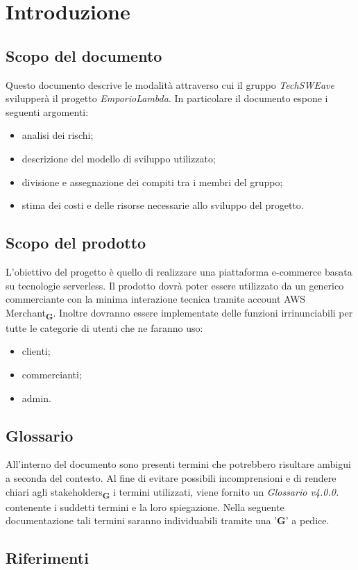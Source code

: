 \section{Introduzione}
\subsection{Scopo del documento}
Questo documento descrive le modalità attraverso cui il gruppo \emph{TechSWEave} svilupperà il progetto \emph{EmporioLambda}. In particolare il documento espone i seguenti argomenti:
\begin{itemize}
    \item analisi dei rischi;
    \item descrizione del modello di sviluppo utilizzato;
    \item divisione e assegnazione dei compiti tra i membri del gruppo;
    \item stima dei costi e delle risorse necessarie allo sviluppo del progetto.
\end{itemize}
\subsection{Scopo del prodotto}
L'obiettivo del progetto è quello di realizzare una piattaforma e-commerce basata su tecnologie serverless. Il prodotto dovrà poter essere utilizzato da un generico commerciante con la minima interazione tecnica tramite account AWS Merchant\textsubscript{\textbf{G}}. Inoltre dovranno essere implementate delle funzioni irrinunciabili per tutte le categorie di utenti che ne faranno uso:
\begin{itemize}
    \item clienti;
    \item commercianti;
    \item admin.
\end{itemize}
\subsection{Glossario}
All'interno del documento sono presenti termini che potrebbero risultare ambigui a seconda del contesto. Al fine di evitare possibili incomprensioni
e di rendere chiari agli stakeholders\textsubscript{\textbf{G}} i termini utilizzati, viene fornito un \textit{Glossario v4.0.0.} contenente i suddetti termini
e la loro spiegazione. Nella seguente documentazione tali termini saranno individuabili tramite una '\textbf{G}' a pedice.
\subsection{Riferimenti}
